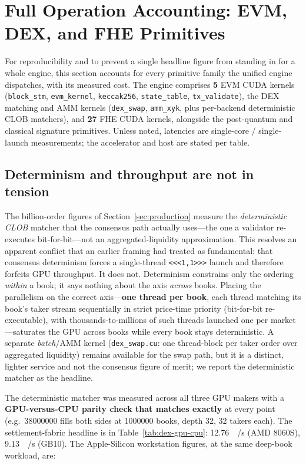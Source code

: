 \section{Full Operation Accounting: EVM, DEX, and FHE Primitives}
\label{sec:accounting}

For reproducibility and to prevent a single headline figure from standing in for a whole engine,
this section accounts for every primitive family the unified engine dispatches, with its measured
cost. The engine comprises \textbf{5} EVM CUDA kernels
(\texttt{block\_stm}, \texttt{evm\_kernel}, \texttt{keccak256}, \texttt{state\_table},
\texttt{tx\_validate}), the DEX matching and AMM kernels
(\texttt{dex\_swap}, \texttt{amm\_xyk}, plus per-backend deterministic CLOB matchers), and
\textbf{27} FHE CUDA kernels, alongside the post-quantum and classical signature primitives.
Unless noted, latencies are single-core / single-launch measurements; the accelerator and host
are stated per table.

\subsection{Determinism and throughput are not in tension}
\label{sec:accounting-dex-honesty}

The billion-order figures of Section~\ref{sec:production} measure the \emph{deterministic CLOB}
matcher that the consensus path actually uses---the one a validator re-executes bit-for-bit---not
an aggregated-liquidity approximation. This resolves an apparent conflict that an earlier framing
had treated as fundamental: that consensus determinism forces a single-thread
\verb|<<<1,1>>>| launch and therefore forfeits GPU throughput. It does not. Determinism constrains
only the ordering \emph{within} a book; it says nothing about the axis \emph{across} books. Placing
the parallelism on the correct axis---\textbf{one thread per book}, each thread matching its book's
taker stream sequentially in strict price-time priority (bit-for-bit re-executable), with
thousands-to-millions of such threads launched one per market---saturates the GPU across books
while every book stays deterministic. A separate \emph{batch}/AMM kernel
(\texttt{dex\_swap.cu}: one thread-block per taker order over aggregated liquidity) remains
available for the swap path, but it is a distinct, lighter service and not the consensus figure of
merit; we report the deterministic matcher as the headline.

The deterministic matcher was measured across all three GPU makers with a
\textbf{GPU-versus-CPU parity check that matches exactly} at every point (e.g.\ \num{38000000}
fills both sides at \num{1000000} books, depth 32, 32 takers each). The settlement-fabric headline
is in Table~\ref{tab:dex-gpu-cpu}: \SI{12.76}{\giga{}/\second} (AMD 8060S),
\SI{9.13}{\giga{}/\second} (GB10). The Apple-Silicon workstation figures, at the same
deep-book workload, are:

